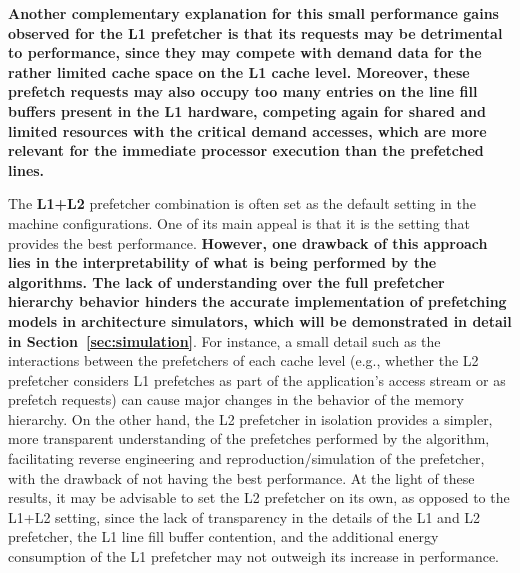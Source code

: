 \documentclass[AMA,final,STIX1COL]{WileyNJD-v2}
\newcommand\new[1]{{\color{red}\textbf{#1}}}
\newcommand{\vsg}[1]{\textcolor{blue}{\bfseries \ul{vsgirelli: #1} }\vspace{0.2cm}}
\newcommand{\fbm}[1]{\textcolor{red}{\bfseries \ul{fbm: #1} }\vspace{0.2cm}}
\begin{document}
\new{Another complementary explanation for this small performance gains observed for the L1 prefetcher is that its requests may be detrimental to performance, since they may compete with demand data for the rather limited cache space on the L1 cache level.
Moreover, these prefetch requests may also occupy too many entries on the line fill buffers present in the L1 hardware, competing again for shared and limited resources with the critical demand accesses, which are more relevant for the immediate processor execution than the prefetched lines.}%

The \textbf{L1+L2} prefetcher combination is often set as the default setting in the machine configurations.
One of its main appeal is that it is the setting that provides the best performance. 
\new{However, one drawback of this approach lies in the interpretability of what is being performed by the algorithms.
The lack of understanding over the full prefetcher hierarchy behavior hinders the accurate implementation of prefetching models in architecture simulators, which will be demonstrated in detail in Section~\ref{sec:simulation}}.%
For instance, a small detail such as the interactions between the prefetchers of each cache level (e.g., whether the L2 prefetcher considers L1 prefetches as part of the application's access stream or as prefetch requests) can cause major changes in the behavior of the memory hierarchy.
On the other hand, the L2 prefetcher in isolation provides a simpler, more transparent understanding of the prefetches performed by the algorithm, facilitating reverse engineering and reproduction/simulation of the prefetcher, with the drawback of not having the best performance.
At the light of these results, it may be advisable to set the L2 prefetcher on its own, as opposed to the L1+L2 setting, since the lack of transparency in the details of the L1 and L2 prefetcher, the L1 line fill buffer contention, and the additional energy consumption of the L1 prefetcher may not outweigh its increase in performance.
\end{document}

